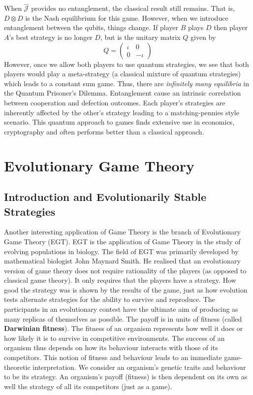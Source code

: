 \documentclass{article}
\theoremstyle{definition}
\begin{document}
When $\hat{\mathcal{J}}$ provides no entanglement, the classical result still remains. That is, $D \otimes D$ is the Nash equilibrium for this game. However, when we introduce entanglement between the qubits, things change. If player $B$ plays $D$ then player $A$'s best strategy is no longer $D$, but is the unitary matrix $Q$ given by 
\[
    Q = 
    \begin{pmatrix}
    \iota & 0 \\
    0 & -\iota
    \end{pmatrix}
\]  
However, once we allow both players to use quantum strategies, we see that both players would play a meta-strategy (a classical mixture of quantum strategies) which leads to a constant sum game. Thus, there are \textit{infinitely many equilibria} in the Quantum Prisoner's Dilemma. Entanglement cause an intrinsic correlation between cooperation and defection outcomes. Each player's strategies are inherently affected by the other's strategy leading to a matching-pennies style scenario. This quantum approach to games finds extensive use in economics, cryptography and often performs better than a classical approach.

\section{Evolutionary Game Theory}

\subsection{Introduction and Evolutionarily Stable Strategies}

Another interesting application of Game Theory is the branch of Evolutionary Game Theory (EGT). EGT is the application of Game Theory in the study of evolving populations in biology. The field of EGT was primarily developed by mathematical biologist John Maynard Smith. He realised that an evolutionary version of game theory does not require rationality of the players (as opposed to classical game theory). It only requires that the players have a strategy. How good the strategy was is shown by the results of the game, just as how evolution tests alternate strategies for the ability to survive and reproduce. The participants in an evolutionary contest have the ultimate aim of producing as many replicas of themselves as possible. The payoff is in units of fitness (called \textbf{Darwinian fitness}). The fitness of an organism represents how well it does or how likely it is to survive in competitive environments. The success of an organism thus depends on how its behaviour interacts with those of its competitors. This notion of fitness and behaviour leads to an immediate game-theoretic interpretation. We consider an organism's genetic traits and behaviour to be its strategy. An organism's payoff (fitness) is then dependent on its own as well the strategy of all its competitors (just as a game).\medskip
\end{document}
